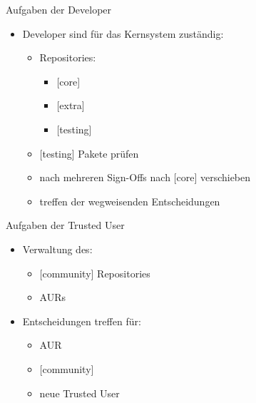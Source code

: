 
\begin{slide}{Aufgaben der Developer}
	\begin{itemize}
		\item{Developer sind f\"{u}r das Kernsystem zust\"{a}ndig:
			\begin{itemize}
				\item{Repositories:
					\begin{itemize}
						\item{[core]}
						\item{[extra]}
						\item{[testing]}
					\end{itemize}
				}
				\item{[testing] Pakete pr\"{u}fen}
				\item{nach mehreren Sign-Offs nach [core] verschieben}
				\item{treffen der wegweisenden Entscheidungen}
			\end{itemize}
		}
	\end{itemize}
\end{slide}

\begin{slide}{Aufgaben der Trusted User}
	\begin{itemize}
		\item{Verwaltung des:
			\begin{itemize}
				\item{[community] Repositories}
				\item{AURs}
			\end{itemize}
		}
		\item{Entscheidungen treffen f\"{u}r:
			\begin{itemize}
				\item{AUR}
				\item{[community]}
				\item{neue Trusted User}
			\end{itemize}
		}
	\end{itemize}
\end{slide}

